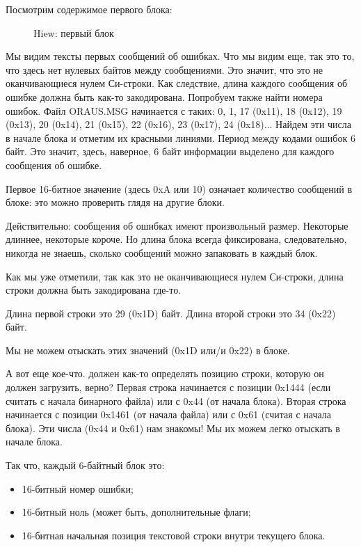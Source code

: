 \clearpage
Посмотрим содержимое первого блока:

\begin{figure}[H]
\centering
{}
\caption{Hiew: первый блок}
\label{fig:oracle_MSB_2}
\end{figure}

Мы видим тексты первых сообщений об ошибках.
Что мы видим еще, так это то, что здесь нет нулевых байтов между сообщениями.
Это значит, что это не оканчивающиеся нулем Си-строки.
Как следствие, длина каждого сообщения об ошибке должна быть как-то закодирована.
Попробуем также найти номера ошибок.
Файл ORAUS.MSG начинается с таких: 
0, 1, 17 (0x11), 18 (0x12), 19 (0x13), 20 (0x14), 21 (0x15), 22 (0x16), 23 (0x17), 24 (0x18)...
Найдем эти числа в начале блока и отметим их красными линиями.
Период между кодами ошибок 6 байт.
Это значит, здесь, наверное, 6 байт информации выделено для каждого сообщения об ошибке.

Первое 16-битное значение (здесь 0xA или 10) означает количество сообщений в блоке: это можно проверить глядя на другие блоки.

Действительно: сообщения об ошибках имеют произвольный размер. 
Некоторые длиннее, некоторые короче. 
Но длина блока всегда фиксирована, следовательно, никогда не знаешь, сколько сообщений можно запаковать
в каждый блок.

Как мы уже отметили, так как это не оканчивающиеся нулем Си-строки, длина строки должна быть закодирована где-то.%

Длина первой строки  это 
29 (0x1D) байт.
Длина второй строки  
это 34 (0x22) байт.

Мы не можем отыскать этих значений (0x1D или/и 0x22) в блоке.

А вот еще кое-что.
\oracle должен как-то определять позицию строки, которую он должен загрузить, верно?
Первая строка  начинается с позиции 0x1444 (если считать с начала бинарного файла) или с 0x44 (от начала блока).
Вторая строка  
начинается с позиции 0x1461 (от начала файла) или с 0x61 (считая с начала блока).
Эти числа (0x44 и 0x61) нам знакомы! 
Мы их можем легко отыскать в начале блока.

Так что, каждый 6-байтный блок это:

\begin{itemize}
\item 16-битный номер ошибки; 
\item 16-битный ноль (может быть, дополнительные флаги; 
\item 16-битная начальная позиция текстовой строки внутри текущего блока.
\end{itemize}

